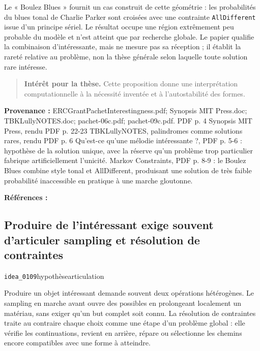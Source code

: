 \documentclass[10pt,a4paper]{article}
\begin{document}
Le « Boulez Blues » fournit un cas construit de cette géométrie : les probabilités du blues tonal de Charlie Parker sont croisées avec une contrainte \texttt{AllDifferent} issue d'un principe sériel. Le résultat occupe une région extrêmement peu probable du modèle et n'est atteint que par recherche globale. Le papier qualifie la combinaison d'intéressante, mais ne mesure pas sa réception ; il établit la rareté relative au problème, non la thèse générale selon laquelle toute solution rare intéresse.

\begin{quote}
\textbf{Intérêt pour la thèse.} Cette proposition donne une interprétation computationnelle à la nécessité inventée et à l'autostabilité des formes.
\end{quote}
{\footnotesize\color{metadata}\textbf{Provenance :} ERCGrantPachetInterestingness.pdf; Synopsis MIT Press.doc; TBKLullyNOTES.doc; pachet-06c.pdf; pachet-09c.pdf. PDF p. 4 Synopsis MIT Press, rendu PDF p. 22-23 TBKLullyNOTES, palindromes comme solutions rares, rendu PDF p. 6 Qu'est-ce qu'une mélodie intéressante ?, PDF p. 5-6 : hypothèse de la solution unique, avec la réserve qu'un problème trop particulier fabrique artificiellement l'unicité. Markov Constraints, PDF p. 8-9 : le Boulez Blues combine style tonal et AllDifferent, produisant une solution de très faible probabilité inaccessible en pratique à une marche gloutonne.\par}
{\footnotesize\color{metadata}\textbf{Références :} \parencite{pachet2000melodie,pachet2011markov}\par}

\subsection{Produire de l'intéressant exige souvent d'articuler sampling et résolution de contraintes}
{\small\color{metadata} \texttt{idea\_0109}\quad\textbullet\quad hypothèse\quad\textbullet\quad articulation\par}

Produire un objet intéressant demande souvent deux opérations hétérogènes. Le sampling en marche avant ouvre des possibles en prolongeant localement un matériau, sans exiger qu'un but complet soit connu. La résolution de contraintes traite au contraire chaque choix comme une étape d'un problème global : elle vérifie les continuations, revient en arrière, répare ou sélectionne les chemins encore compatibles avec une forme à atteindre.
\end{document}
